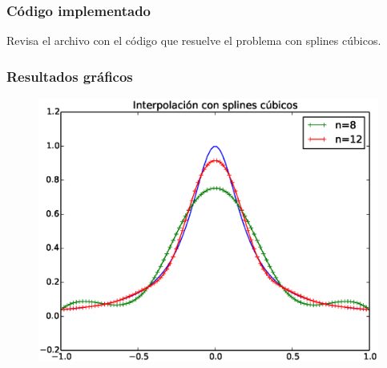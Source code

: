 \documentclass[12pt]{beamer}
\begin{document}
\begin{frame}
\frametitle{Código implementado}
Revisa el archivo con el código que resuelve el problema con splines cúbicos.
\end{frame}
\begin{frame}
\frametitle{Resultados gráficos}
\begin{figure}
	\centering
	\includegraphics[scale=0.47]{Imagenes/Funcion_Runge_04.eps} 
\end{figure}
\end{frame}
\end{document}
